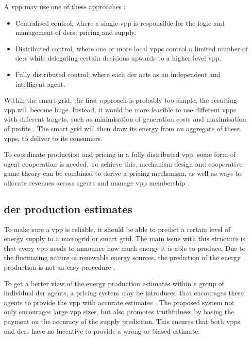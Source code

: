 A \ac{vpp} may use one of these approaches \cite{NikonowiczMilewski2012}:
\begin{itemize}
	\item Centralised control, where a single \ac{vpp} is responsible for the logic and management of \acp{der}, pricing and supply.
	\item Distributed control, where one or more local \acp{vpp} control a limited number of \acp{der} while delegating certain decisions upwards to a higher level \ac{vpp}.
	\item Fully distributed control, where each \ac{der} acts as an independent and intelligent agent.
\end{itemize}

Within the smart grid, the first approach is probably too simple, the resulting \ac{vpp} will become huge. Instead, it would be more feasible to use different \acp{vpp} with different targets, such as minimisation of generation costs and maximisation of profits \cite{LombardiPowalkoRudion2009}. The smart grid will then draw its energy from an aggregate of these \acp{vpp}, to deliver to its consumers. 

To coordinate production and pricing in a fully distributed \ac{vpp}, some form of agent cooperation is needed. To achieve this, mechanism design and cooperative game theory can be combined to derive a pricing mechanism, as well as ways to allocate revenues across agents and manage \ac{vpp} membership \cite{ChalkiadakisRobuKotaEtAl2011}. 

\subsection{\acl{der} production estimates}
\label{vpp:productionestimates}
To make sure a \ac{vpp} is reliable, it should be able to predict a certain level of energy supply to a microgrid or smart grid. The main issue with this structure is that every \ac{vpp} needs to announce how much energy it is able to produce. Due to the fluctuating nature of renewable energy sources, the prediction of the energy production is not an easy procedure \cite{LombardiPowalkoRudion2009}.  

To get a better view of the energy production estimates within a group of individual \ac{der} agents, a pricing system may be introduced that encourages these agents to provide the \ac{vpp} with accurate estimates \cite{ChalkiadakisRobuKotaEtAl2011}. The proposed system not only encourages large \ac{vpp} sizes, but also promotes truthfulness by basing the payment on the accuracy of the supply prediction. This ensures that both \acp{vpp} and \acp{der} have no incentive to provide a wrong or biased estimate.

